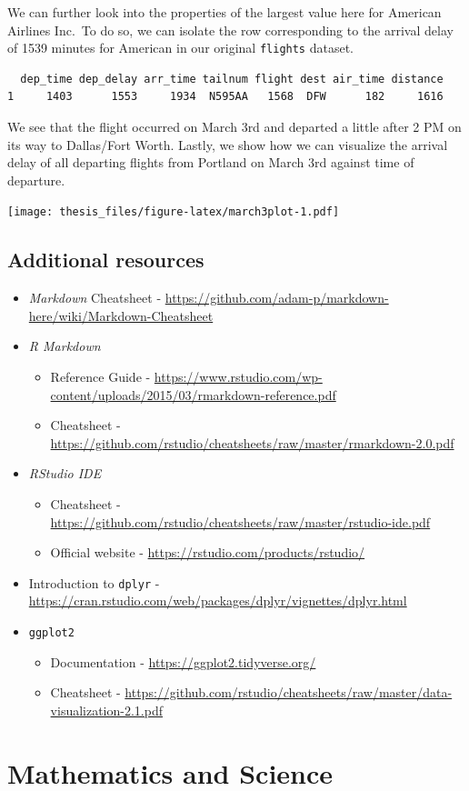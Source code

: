 \documentclass[12pt,twoside]{reedthesis}
\providecommand{\tightlist}{%
  \setlength{\itemsep}{0pt}\setlength{\parskip}{0pt}}
\begin{document}
We can further look into the properties of the largest value here for American Airlines Inc.~To do so, we can isolate the row corresponding to the arrival delay of 1539 minutes for American in our original \texttt{flights} dataset.
\begin{verbatim}
  dep_time dep_delay arr_time tailnum flight dest air_time distance
1     1403      1553     1934  N595AA   1568  DFW      182     1616
\end{verbatim}
We see that the flight occurred on March 3rd and departed a little after 2 PM on its way to Dallas/Fort Worth. Lastly, we show how we can visualize the arrival delay of all departing flights from Portland on March 3rd against time of departure.

\texttt{[image: thesis\_files/figure-latex/march3plot-1.pdf]}

\hypertarget{additional-resources}{%
\section{Additional resources}\label{additional-resources}}
\begin{itemize}
\item
  \emph{Markdown} Cheatsheet - \url{https://github.com/adam-p/markdown-here/wiki/Markdown-Cheatsheet}
\item
  \emph{R Markdown}
  \begin{itemize}
  \tightlist
  \item
    Reference Guide - \url{https://www.rstudio.com/wp-content/uploads/2015/03/rmarkdown-reference.pdf}
  \item
    Cheatsheet - \url{https://github.com/rstudio/cheatsheets/raw/master/rmarkdown-2.0.pdf}
  \end{itemize}
\item
  \emph{RStudio IDE}
  \begin{itemize}
  \tightlist
  \item
    Cheatsheet - \url{https://github.com/rstudio/cheatsheets/raw/master/rstudio-ide.pdf}
  \item
    Official website - \url{https://rstudio.com/products/rstudio/}
  \end{itemize}
\item
  Introduction to \texttt{dplyr} - \url{https://cran.rstudio.com/web/packages/dplyr/vignettes/dplyr.html}
\item
  \texttt{ggplot2}
  \begin{itemize}
  \tightlist
  \item
    Documentation - \url{https://ggplot2.tidyverse.org/}
  \item
    Cheatsheet - \url{https://github.com/rstudio/cheatsheets/raw/master/data-visualization-2.1.pdf}
  \end{itemize}
\end{itemize}
\hypertarget{math-sci}{%
\chapter{Mathematics and Science}\label{math-sci}}
\end{document}
